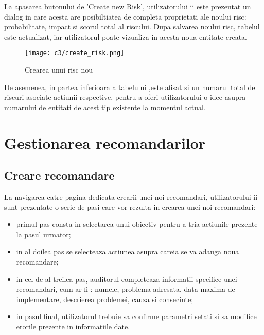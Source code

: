 La apasarea butonului de 'Create new Risk', utilizatorului ii este prezentat un dialog in care acesta are posibiltiatea de completa proprietati ale noului risc: probabilitate, impact si scorul total al riscului. Dupa salvarea noului risc, tabelul este actualizat, iar utilizatorul poate vizualiza in acesta noua entitate creata.

\vspace{1cm}
\begin{figure}[h]
	\centering
	
	\texttt{[image: c3/create\_risk.png]}
	\caption{Crearea unui risc nou}
\end{figure}


De asemenea, in partea inferioara a tabelului ,este afisat si un numarul total de riscuri asociate actiunii respective, pentru a oferi utilizatorului o idee asupra numarului de entitati de acest tip existente la momentul actual. 



\section{Gestionarea recomandarilor}

\subsection*{Creare recomandare}
La navigarea catre pagina dedicata crearii unei noi recomandari, utilizatorului ii sunt prezentate o serie de pasi care vor rezulta in crearea unei noi recomandari:
	
	\begin{itemize}
		\item primul pas consta in selectarea unui obiectiv pentru a tria actiunile prezente la pasul urmator;
		
		\item in al doilea pas se selecteaza actiunea asupra careia se va adauga noua recomandare;
		
		\item in cel de-al treilea pas, auditorul completeaza informatii specifice unei recomandari, cum ar fi : numele, problema adresata, data maxima de implementare, descrierea problemei, cauza si consecinte;
		
		\item in pasul final, utilizatorul trebuie sa confirme parametri setati si sa modifice erorile prezente in informatiile date.
	\end{itemize}


